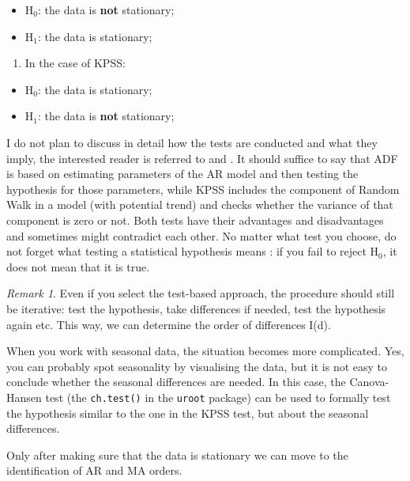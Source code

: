 \documentclass[
]{book}
\providecommand{\tightlist}{%
  \setlength{\itemsep}{0pt}\setlength{\parskip}{0pt}}
\theoremstyle{definition}
\theoremstyle{definition}
\theoremstyle{definition}
\theoremstyle{definition}
\theoremstyle{remark}
\newtheorem*{remark}{Remark}
\begin{document}
\begin{itemize}
\tightlist
\item
  H\(_0\): the data is \textbf{not} stationary;
\item
  H\(_1\): the data is stationary;
\end{itemize}

\begin{enumerate}
\def\labelenumi{\arabic{enumi}.}
\setcounter{enumi}{1}
\tightlist
\item
  In the case of KPSS:
\end{enumerate}

\begin{itemize}
\tightlist
\item
  H\(_0\): the data is stationary;
\item
  H\(_1\): the data is \textbf{not} stationary;
\end{itemize}

I do not plan to discuss in detail how the tests are conducted and what they imply, the interested reader is referred to \citet{Dickey1979} and \citet{Kwiatkowski1992}. It should suffice to say that ADF is based on estimating parameters of the AR model and then testing the hypothesis for those parameters, while KPSS includes the component of Random Walk in a model (with potential trend) and checks whether the variance of that component is zero or not. Both tests have their advantages and disadvantages and sometimes might contradict each other. No matter what test you choose, do not forget what testing a statistical hypothesis means \citep[see Section 5.3 of][]{SvetunkovSBA}: if you fail to reject H\(_0\), it does not mean that it is true.

\begin{remark}
Even if you select the test-based approach, the procedure should still be iterative: test the hypothesis, take differences if needed, test the hypothesis again etc. This way, we can determine the order of differences I(d).
\end{remark}

When you work with seasonal data, the situation becomes more complicated. Yes, you can probably spot seasonality by visualising the data, but it is not easy to conclude whether the seasonal differences are needed. In this case, the Canova-Hansen test (the \texttt{ch.test()} in the \texttt{uroot} package) can be used to formally test the hypothesis similar to the one in the KPSS test, but about the seasonal differences.

Only after making sure that the data is stationary we can move to the identification of AR and MA orders.
\end{document}
